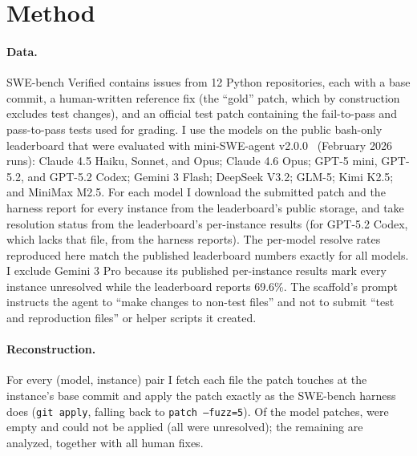\documentclass[10pt]{article}
\begin{document}
\section{Method}\label{sec:method}

\paragraph{Data.} SWE-bench Verified contains \NInstances{} issues from 12 Python repositories, each with a base commit, a human-written reference fix (the ``gold'' patch, which by construction excludes test changes), and an official test patch containing the fail-to-pass and pass-to-pass tests used for grading. I use the \NModels{} models on the public bash-only leaderboard that were evaluated with mini-SWE-agent v2.0.0~\citep{minisweagent,yang2024sweagent} (February 2026 runs): Claude 4.5 Haiku, Sonnet, and Opus; Claude 4.6 Opus; GPT-5 mini, GPT-5.2, and GPT-5.2 Codex; Gemini 3 Flash; DeepSeek V3.2; GLM-5; Kimi K2.5; and MiniMax M2.5. For each model I download the submitted patch and the harness report for every instance from the leaderboard's public storage, and take resolution status from the leaderboard's per-instance results (for GPT-5.2 Codex, which lacks that file, from the harness reports). The per-model resolve rates reproduced here match the published leaderboard numbers exactly for all \NModels{} models. I exclude Gemini 3 Pro because its published per-instance results mark every instance unresolved while the leaderboard reports 69.6\%. The scaffold's prompt instructs the agent to ``make changes to non-test files'' and not to submit ``test and reproduction files'' or helper scripts it created.

\paragraph{Reconstruction.} For every (model, instance) pair I fetch each file the patch touches at the instance's base commit and apply the patch exactly as the SWE-bench harness does (\texttt{git apply}, falling back to \texttt{patch --fuzz=5}). Of the \NModelPatches{} model patches, \NEmpty{} were empty and \NFailed{} could not be applied (all \NFailed{} were unresolved); the remaining \NModelAnalyzed{} are analyzed, together with all \NInstances{} human fixes.
\end{document}
